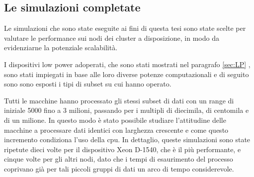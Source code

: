 %
%
 
\subsection{Le simulazioni completate} 
\label{subsec:simc}
Le simulazioni che sono state eseguite ai fini di questa tesi sono state scelte per valutare le performance sui nodi dei cluster a disposizione, in modo da evidenziarne la potenziale scalabilità.

I dispositivi low power adoperati, che sono stati mostrati nel paragrafo \ref{sec:LP} , sono stati impiegati in base alle loro diverse potenze computazionali e di seguito sono sono esposti i tipi di subset su cui hanno operato.

Tutti le macchine hanno processato gli stessi subset di dati con un range di iniziale 5000 fino a 3 milioni, passando per i multipli di diecimila, di centomila e di un milione.
In questo modo è stato possibile studiare l'attitudine delle macchine a processare dati identici con larghezza crescente e come questo incremento condiziona l'uso della cpu. 
In dettaglio, queste simulazioni sono state ripetute dieci volte per il dispositivo {Xeon D-1540}, che è il più performante, e cinque volte per gli altri nodi, dato che i tempi di esaurimento del processo coprivano già per tali piccoli gruppi di dati un arco di tempo considerevole.


